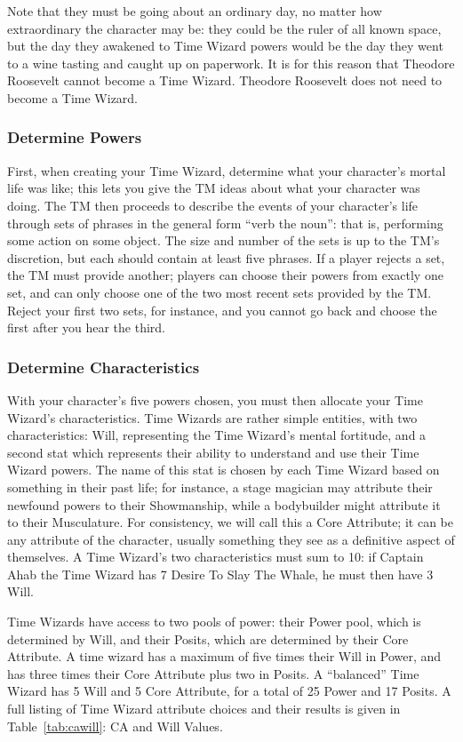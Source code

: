 \documentclass{article}
\begin{document}
Note that they must be going about an ordinary day, no matter how extraordinary the character
may be: they could be the ruler of all known space, but the day they awakened to Time Wizard
powers would be the day they went to a wine tasting and caught up on paperwork. It is for this
reason that Theodore Roosevelt cannot become a Time Wizard. Theodore Roosevelt does not need to
become a Time Wizard.

\subsubsection{Determine Powers} \label{ssec:get-powers}
First, when creating your Time Wizard, determine what your character's mortal life was like;
this lets you give the TM ideas about what your character was doing. The TM then proceeds to
describe the events of your character's life through sets of phrases in the general form
``verb the noun'': that is, performing some action on some object. The size and number of the
sets is up to the TM's discretion, but each should contain at least five phrases. If a player
rejects a set, the TM must provide another; players can choose their powers from exactly one
set, and can only choose one of the two most recent sets provided by the TM. Reject your first
two sets, for instance, and you cannot go back and choose the first after you hear the third.

\subsubsection{Determine Characteristics} \label{ssec:get-characteristics}
With your character's five powers chosen, you must then allocate your Time Wizard's
characteristics. Time Wizards are rather simple entities, with two characteristics: Will,
representing the Time Wizard's mental fortitude, and a second stat which represents their
ability to understand and use their Time Wizard powers. The name of this stat is chosen by each
Time Wizard based on something in their past life; for instance, a stage magician may attribute
their newfound powers to their Showmanship, while a bodybuilder might attribute it to their
Musculature. For consistency, we will call this a Core Attribute; it can be any attribute of the
character, usually something they see as a definitive aspect of themselves. A Time Wizard's two
characteristics must sum to 10: if Captain Ahab the Time Wizard has 7 Desire To Slay The Whale,
he must then have 3 Will.

Time Wizards have access to two pools of power: their Power pool, which is determined by Will,
and their Posits, which are determined by their Core Attribute. A time wizard has a maximum of
five times their Will in Power, and has three times their Core Attribute plus two in Posits.
A ``balanced'' Time Wizard has 5 Will and 5 Core Attribute, for a total of 25 Power and 17
Posits. A full listing of Time Wizard attribute choices and their results is given in
Table~\ref{tab:cawill}: CA and Will Values.
\end{document}

